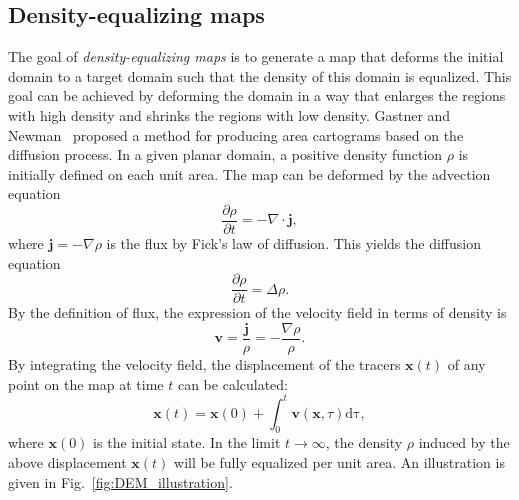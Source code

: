 \documentclass{article}
\begin{document}
\subsection{Density-equalizing maps}\label{sse:density-equalizing}
The goal of \emph{density-equalizing maps} is to generate a map that deforms the initial domain to a target domain such that the density of this domain is equalized. This goal can be achieved by deforming the domain in a way that enlarges the regions with high density and shrinks the regions with low density.
Gastner and Newman~\cite{gastner2004diffusion} proposed a method for producing area cartograms based on the diffusion process. In a given planar domain, a positive density function $\rho$ is initially defined on each unit area. 
The map can be deformed  by the advection equation
\begin{equation}\label{advection}
    \frac{\partial \rho}{\partial t} = - \nabla \cdot \mathbf{j},
\end{equation}
where $\mathbf{j} = - \nabla \rho$ is the flux by Fick's law of diffusion. This yields the diffusion equation
\begin{equation}\label{eqt:duffusion}
    \frac{\partial \rho}{\partial t} = \Delta \rho.
\end{equation}
By the definition of flux, the expression of the velocity field in terms of density is 
\begin{equation}\label{eqt:velocity}
    \mathbf{v} = \frac{\mathbf{j}}{\rho} = -\frac{\nabla \rho}{\rho}.
\end{equation}
By integrating the velocity field, the displacement of the tracers $\mathbf{x}(t)$ of any point on the map at time $t$ can be calculated:
\begin{equation}\label{displacement}
    \mathbf{x}(t) = \mathbf{x}(0) + \int^{t}_{0} \mathbf{v}(\mathbf{x},\tau) \mathrm{d\tau},
\end{equation}
where $\mathbf{x}(0)$ is the initial state. In the limit $t \rightarrow \infty$, the density $\rho$ induced by the above displacement $\mathbf{x}(t)$ will be fully equalized per unit area. An illustration is given in Fig.~\ref{fig:DEM_illustration}.

\end{document}
